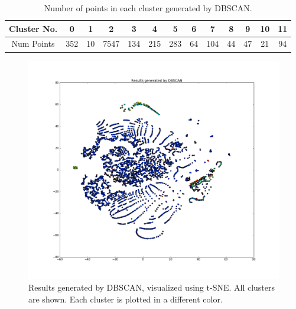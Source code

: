 \begin{table}[!ht]
	\caption{Number of points in each cluster generated by DBSCAN.}
	\small
	\begin{center}
		\begin{tabular}{|c|c|c|c|c|c|c|c|c|c|c|c|c|}
			\hline
			Cluster No. &    0 & 1  & 2    & 3   & 4   & 5   & 6  & 7   & 8  & 9  & 10 & 11	\\ \hline
			Num Points  &  352 & 10 & 7547 & 134 & 215 & 283 & 64 & 104 & 44 & 47 & 21 & 94 \\
			\hline

		\end{tabular}
	\end{center}
	\label{tab:ClusterResult}
\end{table}

\begin{figure}[!ht]
	\begin{center}
		\includegraphics[width=\textwidth]{images/ClusterResult}
		\caption{Results generated by DBSCAN, visualized using t-SNE. All clusters are shown. Each cluster is plotted in a different color.}
		\label{fig:ClusterResult}
	\end{center}
\end{figure}

